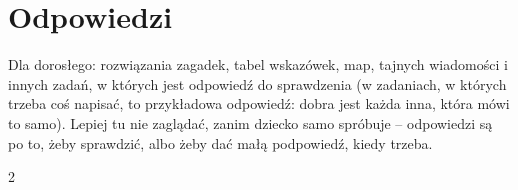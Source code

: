 \section*{Odpowiedzi}

Dla dorosłego: rozwiązania zagadek, tabel wskazówek, map, tajnych
wiadomości i innych zadań, w których jest odpowiedź do sprawdzenia (w
zadaniach, w których trzeba coś napisać, to przykładowa odpowiedź:
dobra jest każda inna, która mówi to samo). Lepiej tu nie zaglądać,
zanim dziecko samo spróbuje -- odpowiedzi są po to, żeby sprawdzić,
albo żeby dać małą podpowiedź, kiedy trzeba.

\begin{multicols}{2}
\footnotesize
\raggedright
\begin{itemize}[leftmargin=0mm, label={}, itemsep=2mm, topsep=0mm]

\end{itemize}
\end{multicols}
\newpage
